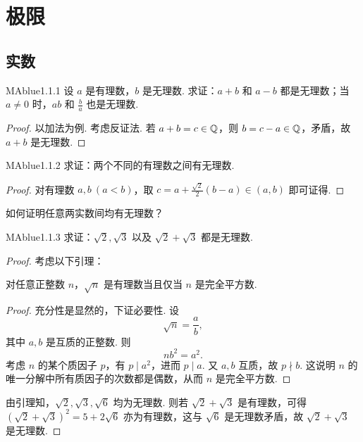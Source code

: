 \chapter{极限}

\section{实数}

\begin{problem}{MAblue}{1.1.1}
    设 $a$ 是有理数，$b$ 是无理数. 求证：$a + b$ 和 $a - b$ 都是无理数；当 $a \neq 0$ 时，$ab$ 和 $\frac b a$ 也是无理数.
\end{problem}

\begin{proof}
    以加法为例. 考虑反证法. 若 $a + b = c \in \mathbb Q$，则 $b = c - a \in \mathbb Q$，矛盾，故 $a + b$ 是无理数.
\end{proof}

\begin{problem}{MAblue}{1.1.2}
    求证：两个不同的有理数之间有无理数.
\end{problem}

\begin{proof}
    对有理数 $a, b \ (a < b)$，取 $c = a + \frac {\sqrt 2} 2 (b-a) \in (a, b)$ 即可证得.
\end{proof}

\begin{think}
    如何证明任意两实数间均有无理数？
\end{think}

\begin{problem}{MAblue}{1.1.3}
    求证：$\sqrt 2, \sqrt 3$ 以及 $\sqrt 2 + \sqrt 3$ 都是无理数.
\end{problem}

\begin{proof}
    考虑以下引理：
    \begin{center}
        \begin{minipage}{0.85\textwidth}
            \begin{lemma}{}{}
                对任意正整数 $n$，$\sqrt n$ 是有理数当且仅当 $n$ 是完全平方数.
                \tcblower
                \begin{proof}
                    充分性是显然的，下证必要性. 设
                    \[
                        \sqrt n = \frac a b,
                    \]
                    其中 $a, b$ 是互质的正整数. 则
                    \[
                        nb^2 = a^2.
                    \]
                    考虑 $n$ 的某个质因子 $p$，有 $p \mid a^2$，进而 $p \mid a$. 又 $a, b$ 互质，故 $p \nmid b$. 这说明 $n$ 的唯一分解中所有质因子的次数都是偶数，从而 $n$ 是完全平方数.
                \end{proof}
            \end{lemma}
        \end{minipage}
    \end{center}
    由引理知，$\sqrt 2, \sqrt 3, \sqrt 6$ 均为无理数. 则若 $\sqrt 2 + \sqrt 3$ 是有理数，可得 $(\sqrt 2 + \sqrt 3)^2 = 5 + 2 \sqrt 6$ 亦为有理数，这与 $\sqrt 6$ 是无理数矛盾，故 $\sqrt 2 + \sqrt 3$ 是无理数.
\end{proof}

